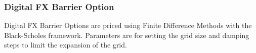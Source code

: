 \subsubsection{Digital FX Barrier Option}
\label{pricing:fx_digitalbarrieroption}

Digital FX Barrier Options are priced using Finite Difference Methods with the 
Black-Scholes framework. Parameters are for setting the grid size and damping 
steps to limit the expansion of the grid.
